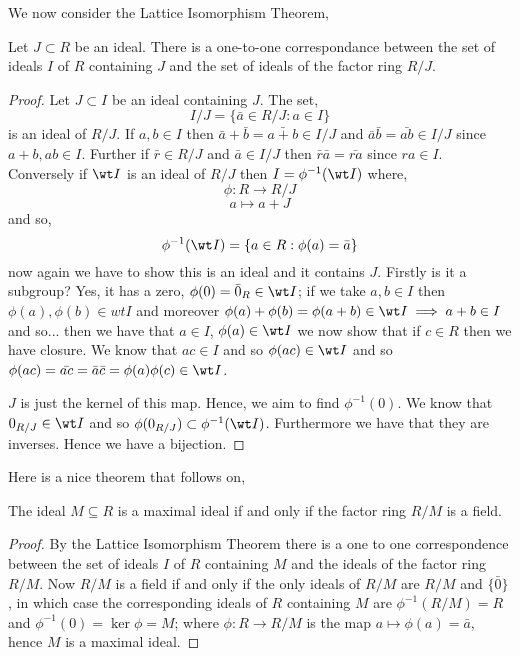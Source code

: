 \noindent
We now consider the Lattice Isomorphism Theorem,
\begin{nthm}
  Let $J \subset R$ be an ideal. There is a one-to-one correspondance between the set of ideals $I$ of $R$ containing $J$ and the set of ideals of the factor ring $R/J$.
\end{nthm}
\begin{proof}
  Let $J \subset I$ be an ideal containing $J$. The set,
  $$ I/J = \{\bar a \in R/J : a \in I\} $$
  is an ideal of $R/J$. If $a,b \in I$ then $\bar a + \bar b = \bar{a + b} \in I/J$ and $\bar a \bar b = \bar{ab} \in I/J$ since $a+b, ab \in I$. Further if $\bar r \in R/J$ and $\bar a \in I/J$ then $\bar r \bar a = \bar{ra}$ since $ra \in I$. Conversely if $\wt I$ is an ideal of $R/J$ then $I = \phi^{-1}(\wt I)$ where,
  $$ \phi : R \to R/J $$
  $$ a \mapsto a + J $$
  and so,
  $$ \phi^{-1}(\wt I) = \{a \in R : \phi(a) = \bar a\} $$
  now again we have to show this is an ideal and it contains $J$. Firstly is it a subgroup? Yes, it has a zero, $\phi(0) = \bar 0_R \in \wt I$; if we take $a, b \in I$ then $\phi(a), \phi(b) \in wt I$ and moreover $\phi(a) + \phi(b) = \phi(a + b) \in \wt I \implies a + b \in I$ and so... then we have that $a \in I$, $\phi(a) \in \wt I$ we now show that if $c \in R$ then we have closure. We know that $ac \in I$ and so $\phi(ac) \in \wt I$ and so $\phi(ac) = \bar{ac} = \bar a \bar c = \phi(a)\phi(c) \in \wt I$.

  \noindent
  $J$ is just the kernel of this map. Hence, we aim to find $\phi^{-1}(0)$. We know that $0_{R/J} \in \wt I$ and so $\phi(0_{R/J}) \subset \phi^{-1}(\wt I)$. Furthermore we have that they are inverses. Hence we have a bijection.
\end{proof}

Here is a nice theorem that follows on,
\begin{nthm}
  The ideal $M \subseteq R$ is a maximal ideal if and only if the factor ring $R/M$ is a field.
\end{nthm}
\begin{proof}
  By the Lattice Isomorphism Theorem there is a one to one correspondence between the set of ideals $I$ of $R$ containing $M$ and the ideals of the factor ring $R/M$. Now $R/M$ is a field if and only if the only ideals of $R/M$ are $R/M$ and $\{\bar 0\}$, in which case the corresponding ideals of $R$ containing $M$ are $\phi^{-1}(R/M) = R$ and $\phi^{-1}(0) = \ker \phi = M$; where $\phi: R \to R/M$ is the map $a \mapsto \phi(a) = \bar a$, hence $M$ is a maximal ideal.
\end{proof}

